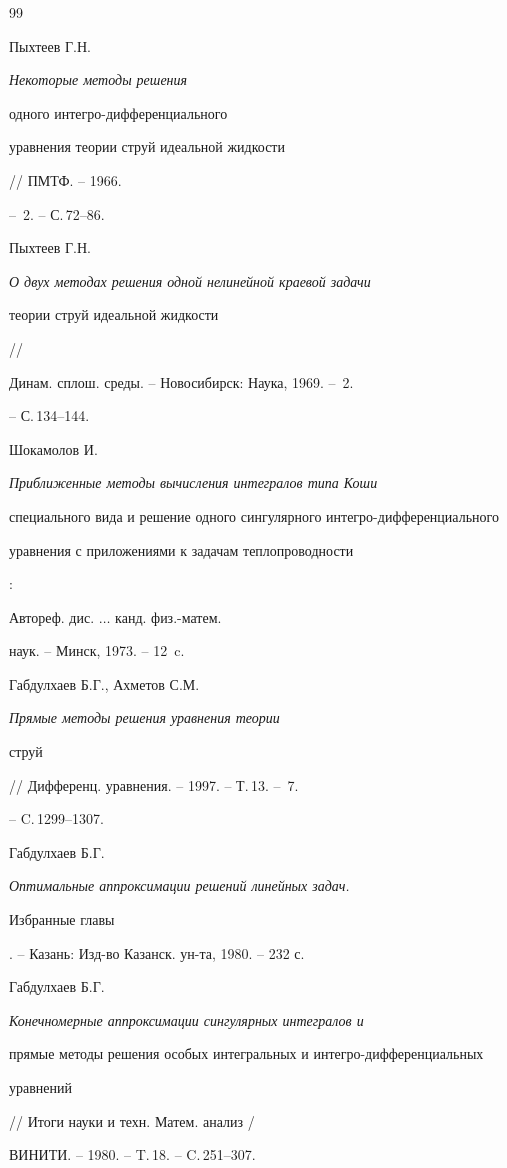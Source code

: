 \begin{thebibliography}{99}







Пыхтеев Г.Н. {\em Некоторые методы решения 


одного интегро-дифференциального


уравнения теории струй идеальной жидкости} // ПМТФ. -- 1966.


-- \No\,2. -- С.\,72--86.




Пыхтеев Г.Н. {\em О двух методах решения одной нелинейной краевой задачи 


теории струй идеальной жидкости} // 


Динам. сплош. среды. -- Новосибирск: Наука, 1969. -- \No\,2.


-- С.\,134--144.




Шокамолов И. {\em Приближенные методы вычисления интегралов типа Коши 


специального вида и решение одного сингулярного интегро-дифференциального


уравнения с приложениями к задачам теплопроводности}:


Автореф. дис. $\dotsc$ канд. физ.-матем. 


наук. -- Минск, 1973. -- 12~c.




Габдулхаев Б.Г., Ахметов С.М. {\em Прямые методы решения уравнения теории


струй} // Дифференц. уравнения. -- 1997. -- Т.\,13. -- \No\,7.


-- C.\,1299--1307.




Габдулхаев Б.Г. {\em Оптимальные аппроксимации решений линейных задач.


Избранные главы}. -- Казань: Изд-во Казанск. ун-та, 1980. -- 232 с.




Габдулхаев Б.Г. {\em Конечномерные аппроксимации сингулярных интегралов и 


прямые методы решения особых интегральных и интегро-дифференциальных


уравнений} // Итоги науки и техн. Матем. анализ /


ВИНИТИ. -- 1980. -- T.\,18. -- C.\,251--307.



\end{thebibliography}

